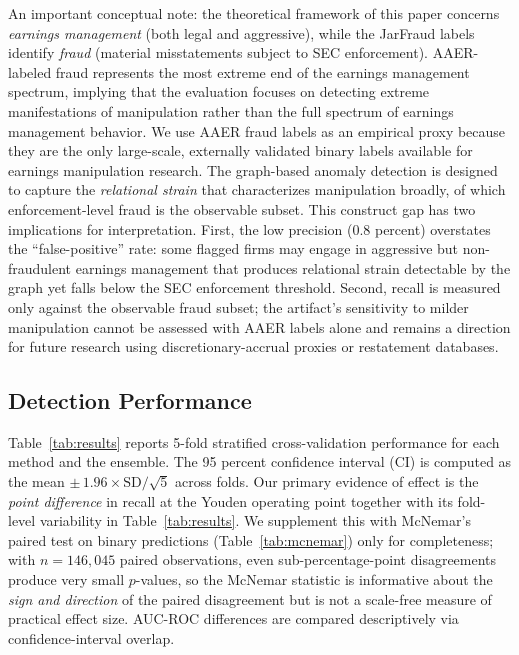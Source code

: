 \documentclass[12pt]{article}
\begin{document}
An important conceptual note: the theoretical framework of this paper
concerns \emph{earnings management} (both legal and aggressive), while the
JarFraud labels identify \emph{fraud} (material misstatements subject to SEC
enforcement).  AAER-labeled fraud represents the most extreme end of the
earnings management spectrum, implying that the evaluation focuses on
detecting extreme manifestations of manipulation rather than the full
spectrum of earnings management behavior.  We use AAER fraud labels as an empirical proxy
because they are the only large-scale, externally validated binary labels
available for earnings manipulation research.  The graph-based anomaly
detection is designed to capture the \emph{relational strain} that
characterizes manipulation broadly, of which enforcement-level fraud is the
observable subset.  This construct gap has two implications for
interpretation.  First, the low precision (0.8 percent) overstates the
``false-positive'' rate: some flagged firms may engage in aggressive but
non-fraudulent earnings management that produces relational strain
detectable by the graph yet falls below the SEC enforcement threshold.
Second, recall is measured only against the observable fraud subset;
the artifact's sensitivity to milder manipulation cannot be assessed
with AAER labels alone and remains a direction for future research using
discretionary-accrual proxies or restatement databases.

\subsection*{Detection Performance}
\label{subsec:perf}

Table~\ref{tab:results} reports 5-fold stratified cross-validation
performance for each method and the ensemble.  The 95 percent confidence
interval (CI) is computed as the mean $\pm\,1.96 \times \text{SD}/\sqrt{5}$
across folds.  Our primary evidence of effect is the \emph{point difference}
in recall at the Youden operating point together with its fold-level
variability in Table~\ref{tab:results}.  We supplement this with McNemar's
paired test on binary predictions (Table~\ref{tab:mcnemar}) only for
completeness; with $n = 146{,}045$ paired observations, even sub-percentage-point
disagreements produce very small $p$-values, so the McNemar statistic
is informative about the \emph{sign and direction} of the paired disagreement
but is not a scale-free measure of practical effect size.  AUC-ROC
differences are compared descriptively via confidence-interval overlap.
\end{document}
